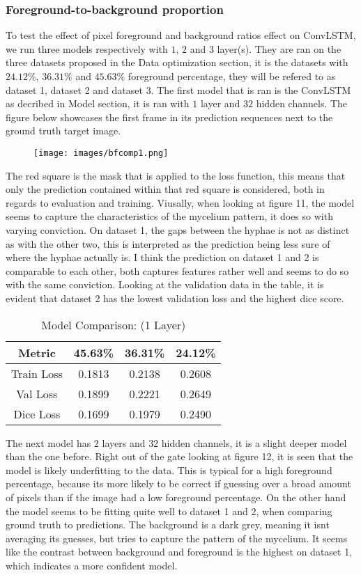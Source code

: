 \documentclass[a4paper,12pt]{article}
\begin{document}
\subsubsection{Foreground-to-background proportion}
To test the effect of pixel foreground and background ratios effect on ConvLSTM, we run three models respectively with $1$, $2$ and $3$ layer(s). They are ran on the three datasets proposed in the Data optimization section, it is the datasets with $24.12\%$, $36.31\%$ and $45.63\%$ foreground percentage, they will be refered to as dataset 1, dataset 2 and dataset 3.
The first model that is ran is the ConvLSTM as decribed in Model section, it is ran with $1$ layer and $32$ hidden channels. The figure below showcases the first frame in its prediction sequences next to the ground truth target image.
\begin{figure}[H]
  \centering
  \texttt{[image: images/bfcomp1.png]}
  \caption{} %
  \label{fig:n14}
\end{figure}
The red square is the mask that is applied to the loss function, this means that only the prediction contained within that red square is considered, both in regards to evaluation and training. 
Viusally, when looking at figure 11, the model seems to capture the characteristics of the mycelium pattern, it does so with varying conviction. On dataset 1, the gaps between the hyphae is not as distinct as with the other two, this is interpreted as the prediction being less sure of where the hyphae actually is. I think the prediction on dataset 1 and 2 is comparable to each other, both captures features rather well and seems to do so with the same conviction. Looking at the validation data in the table, it is evident that dataset 2 has the lowest validation loss and the highest dice score.
\begin{table}[H]
  \centering
  \caption{Model Comparison: (1 Layer)}
  \begin{tabular}{|c|c|c|c|}
  \hline
  Metric & 45.63\% & 36.31\% & 24.12\% \\
  \hline
  Train Loss & 0.1813 & 0.2138 & 0.2608 \\
  Val Loss   & 0.1899 & 0.2221 & 0.2649 \\
  Dice Loss  & 0.1699 & 0.1979 & 0.2490 \\
  \hline
  \end{tabular}
\end{table}
The next model has $2$ layers and $32$ hidden channels, it is a slight deeper model than the one before. Right out of the gate looking at figure 12, it is seen that the model is likely underfitting to the data. This is typical for a high foreground percentage, because its more likely to be correct if guessing over a broad amount of pixels than if the image had a low foreground percentage. On the other hand the model seems to be fitting quite well to dataset 1 and 2, when comparing ground truth to predictions. The background is a dark grey, meaning it isnt averaging its guesses, but tries to capture the pattern of the mycelium. It seems like the contrast between background and foreground is the highest on dataset 1, which indicates a more confident model. 
\end{document}
